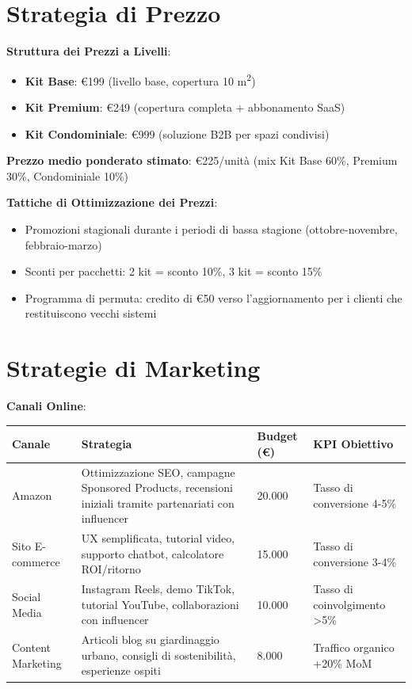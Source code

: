\documentclass[11pt,a4paper]{report}
\begin{document}
\section{Strategia di Prezzo}
\textbf{Struttura dei Prezzi a Livelli}:
\begin{itemize}
    \item \textbf{Kit Base}: €199 (livello base, copertura 10 m\textsuperscript{2})
    \item \textbf{Kit Premium}: €249 (copertura completa + abbonamento SaaS)
    \item \textbf{Kit Condominiale}: €999 (soluzione B2B per spazi condivisi)
\end{itemize}

\textbf{Prezzo medio ponderato stimato}: €225/unità (mix Kit Base 60\%, Premium 30\%, Condominiale 10\%)

\textbf{Tattiche di Ottimizzazione dei Prezzi}:
\begin{itemize}
    \item Promozioni stagionali durante i periodi di bassa stagione (ottobre-novembre, febbraio-marzo)
    \item Sconti per pacchetti: 2 kit = sconto 10\%, 3 kit = sconto 15\%
    \item Programma di permuta: credito di €50 verso l'aggiornamento per i clienti che restituiscono vecchi sistemi
\end{itemize}

\section{Strategie di Marketing}

\textbf{Canali Online}:

\begin{longtable}{|p{2.5cm}|p{3.5cm}|p{2cm}|p{2cm}|}
\hline
\textbf{Canale} & \textbf{Strategia} & \textbf{Budget (€)} & \textbf{KPI Obiettivo} \\ \hline
Amazon & Ottimizzazione SEO, campagne Sponsored Products, recensioni iniziali tramite partenariati con influencer & 20.000 & Tasso di conversione 4-5\% \\ \hline
Sito E-commerce & UX semplificata, tutorial video, supporto chatbot, calcolatore ROI/ritorno & 15.000 & Tasso di conversione 3-4\% \\ \hline
Social Media & Instagram Reels, demo TikTok, tutorial YouTube, collaborazioni con influencer & 10.000 & Tasso di coinvolgimento >5\% \\ \hline
Content Marketing & Articoli blog su giardinaggio urbano, consigli di sostenibilità, esperienze ospiti & 8.000 & Traffico organico +20\% MoM \\ \hline
\end{longtable}
\end{document}
